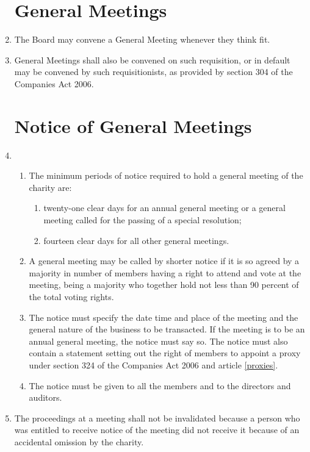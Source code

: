 \begin{enumerate}
\section{General Meetings}
\item
    The Board may convene a General Meeting whenever they think fit. 

\item 
    General Meetings shall also be convened on such requisition, or in default may be convened by such
    requisitionists, as provided by section 304 of the Companies Act 2006.

\section{Notice of General Meetings}

\item
  \begin{enumerate}
  \item
    The minimum periods of notice required to hold a general meeting of
    the charity are:
    \begin{enumerate}
    \item
      twenty-one clear days for an annual general meeting or a general
      meeting called for the passing of a special resolution;
    \item
      fourteen clear days for all other general meetings.
    \end{enumerate}
  \item
    A general meeting may be called by shorter notice if it is so
    agreed by a majority in number of members having a right to attend
    and vote at the meeting, being a majority who together hold not
    less than 90 percent of the total voting rights.
  \item
    The notice must specify the date time and place of the meeting and
    the general nature of the business to be transacted. If the meeting
    is to be an annual general meeting, the notice must say so. The
    notice must also contain a statement setting out the right of
    members to appoint a proxy under section 324 of the Companies Act
    2006 and article \ref{proxies}.
  \item
    The notice must be given to all the members and to the directors
    and auditors.
  \end{enumerate}

\item
  The proceedings at a meeting shall not be invalidated because a
  person who was entitled to receive notice of the meeting did not
  receive it because of an accidental omission by the charity.


\end{enumerate}
